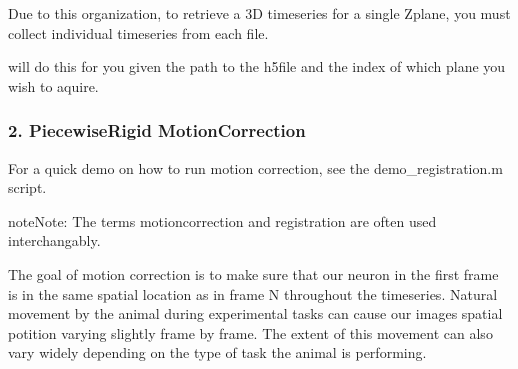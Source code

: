 \documentclass[letterpaper,10pt,english]{sphinxmanual}
\begin{document}
\sphinxAtStartPar
Due to this organization, to retrieve a 3D time\sphinxhyphen{}series for a single Z\sphinxhyphen{}plane, you must collect individual time\sphinxhyphen{}series from each file.

\sphinxAtStartPar
{\hyperref[\detokenize{api/utils:combinePlanes}]{}} will do this for you given the path to the h5file and the index of which plane you wish to aquire.

\begin{sphinxVerbatim}[commandchars=\\\{\}]

\end{sphinxVerbatim}



\subsubsection{2. Piecewise\sphinxhyphen{}Rigid Motion\sphinxhyphen{}Correction}
\label{\detokenize{user_guide/pre_processing:piecewise-rigid-motion-correction}}
\sphinxAtStartPar
For a quick demo on how to run motion correction, see the demo\_registration.m script.

\begin{sphinxadmonition}{note}{Note:}
\sphinxAtStartPar
The terms motion\sphinxhyphen{}correction and registration are often used interchangably.
\end{sphinxadmonition}

\sphinxAtStartPar
The goal of motion correction is to make sure that our neuron in the first frame is in the same spatial location as in frame N throughout the time\sphinxhyphen{}series.
Natural movement by the animal during experimental tasks can cause our images spatial potition varying slightly frame by frame. The extent of this movement can also vary widely depending
on the type of task the animal is performing.
\end{document}
